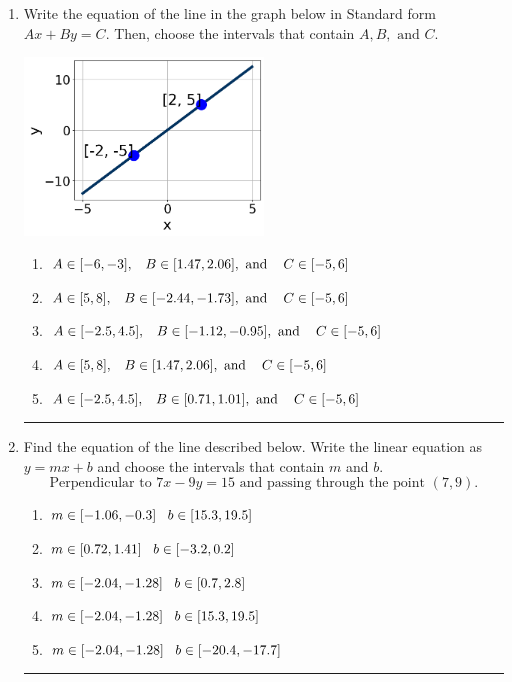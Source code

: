 \documentclass[14pt]{extbook}
\newcommand{\litem}[1]{\item#1\hspace*{-1cm}\rule{\textwidth}{0.4pt}}
\begin{document}
\begin{enumerate}
{\begin{enumerate}[label=\Alph*.]
\end{enumerate} }
\litem{
Write the equation of the line in the graph below in Standard form $Ax+By=C$. Then, choose the intervals that contain $A, B, \text{ and } C$.
\begin{center}
    \includegraphics[width=0.5\textwidth]{../Figures/linearGraphToStandardA.png}
\end{center}
\begin{enumerate}[label=\Alph*.]
\item \( A \in [-6, -3], \hspace{3mm} B \in [1.47, 2.06], \text{ and } \hspace{3mm} C \in [-5, 6] \)
\item \( A \in [5, 8], \hspace{3mm} B \in [-2.44, -1.73], \text{ and } \hspace{3mm} C \in [-5, 6] \)
\item \( A \in [-2.5, 4.5], \hspace{3mm} B \in [-1.12, -0.95], \text{ and } \hspace{3mm} C \in [-5, 6] \)
\item \( A \in [5, 8], \hspace{3mm} B \in [1.47, 2.06], \text{ and } \hspace{3mm} C \in [-5, 6] \)
\item \( A \in [-2.5, 4.5], \hspace{3mm} B \in [0.71, 1.01], \text{ and } \hspace{3mm} C \in [-5, 6] \)

\end{enumerate} }
\litem{
Find the equation of the line described below. Write the linear equation as $ y=mx+b $ and choose the intervals that contain $m$ and $b$.\[ \text{Perpendicular to } 7 x - 9 y = 15 \text{ and passing through the point } (7, 9). \]\begin{enumerate}[label=\Alph*.]
\item \( m \in [-1.06, -0.3] \hspace*{3mm} b \in [15.3, 19.5] \)
\item \( m \in [0.72, 1.41] \hspace*{3mm} b \in [-3.2, 0.2] \)
\item \( m \in [-2.04, -1.28] \hspace*{3mm} b \in [0.7, 2.8] \)
\item \( m \in [-2.04, -1.28] \hspace*{3mm} b \in [15.3, 19.5] \)
\item \( m \in [-2.04, -1.28] \hspace*{3mm} b \in [-20.4, -17.7] \)


\end{enumerate}}
\end{enumerate}
\end{document}
